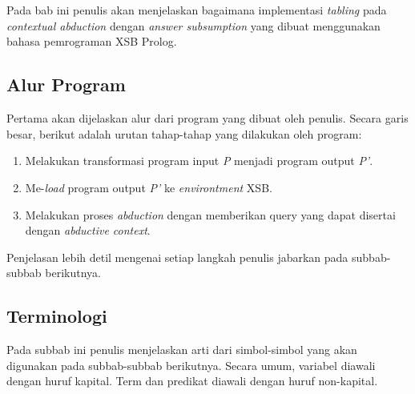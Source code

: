 \chapter{\babTiga}
Pada bab ini penulis akan menjelaskan bagaimana implementasi \textit{tabling} pada \textit{contextual abduction} dengan \textit{answer subsumption} yang dibuat menggunakan bahasa pemrograman XSB Prolog.

\section{Alur Program}

Pertama akan dijelaskan alur dari program yang dibuat oleh penulis. Secara garis besar, berikut adalah urutan tahap-tahap yang dilakukan oleh program:

\begin{enumerate}
	\item Melakukan transformasi program input \textit{P} menjadi program output \textit{P'}.
	\item Me-\textit{load} program output \textit{P'} ke \textit{environtment} XSB.
	\item Melakukan proses \textit{abduction} dengan memberikan query yang dapat disertai dengan \textit{abductive context}.
\end{enumerate}

Penjelasan lebih detil mengenai setiap langkah penulis jabarkan pada subbab-subbab berikutnya.

\section{Terminologi}

Pada subbab ini penulis menjelaskan arti dari simbol-simbol yang akan digunakan pada subbab-subbab berikutnya. Secara umum, variabel diawali dengan huruf kapital. Term dan predikat diawali dengan huruf non-kapital.

